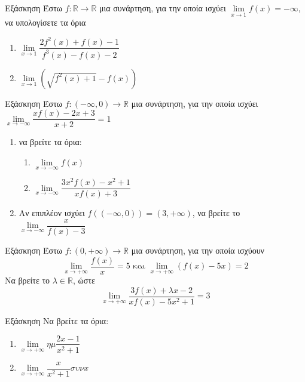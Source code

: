 \documentclass[greek]{beamer}
\begin{document}
\begin{frame}{Εξάσκηση}
      Έστω $f:\mathbb{R}\to\mathbb{R}$ μια συνάρτηση, για την οποία ισχύει $\lim\limits_{x \to 1}{ f(x)  }=-\infty$, να υπολογίσετε τα όρια
      \begin{enumerate}
            \item $\lim\limits_{x \to 1}{ \dfrac{2f^2(x)+f(x)-1}{f^3(x)-f(x)-2} }$ \pause
            \item $\lim\limits_{x \to 1}{ \left( \sqrt{f^2(x)+1}-f(x) \right)  }$
      \end{enumerate}
\end{frame}

\begin{frame}{Εξάσκηση}
      Έστω $f:(-\infty,0)\to\mathbb{R}$ μια συνάρτηση, για την οποία ισχύει $\lim\limits_{x \to -\infty}{ \dfrac{xf(x)-2x+3}{x+2}  }=1$
      \begin{enumerate}
            \item να βρείτε τα όρια:
                  \begin{enumerate}
                        \item $\lim\limits_{x \to -\infty}{ f(x) }$ \pause
                        \item $\lim\limits_{x \to -\infty}{ \dfrac{3x^2f(x)-x^2+1}{xf(x)+3}  }$
                  \end{enumerate}
            \item Αν επιπλέον ισχύει $f\left( (-\infty,0) \right)=(3,+\infty) $, να βρείτε το $\lim\limits_{x \to -\infty}{ \dfrac{x}{f(x)-3} }$
      \end{enumerate}
\end{frame}

\begin{frame}{Εξάσκηση}
      Έστω $f:(0,+\infty)\to\mathbb{R}$ μια συνάρτηση, για την οποία ισχύουν
      $$\lim\limits_{x \to +\infty}{ \dfrac{f(x)}{x} }=5 \text{ και } \lim\limits_{x \to +\infty}{ (f(x)-5x) }=2$$
      Να βρείτε το $λ\in\mathbb{R}$, ώστε
      $$\lim\limits_{x \to +\infty}{ \dfrac{3f(x)+λx-2}{xf(x)-5x^2+1} }=3$$
\end{frame}

\begin{frame}{Εξάσκηση}
      Να βρείτε τα όρια:
      \begin{enumerate}
            \item $\lim\limits_{x \to +\infty}{ ημ\dfrac{2x-1}{x^2+1} }$ \pause
            \item $\lim\limits_{x \to +\infty}{ \dfrac{x}{x^2+1}συνx  }$
      \end{enumerate}
\end{frame}
\end{document}
